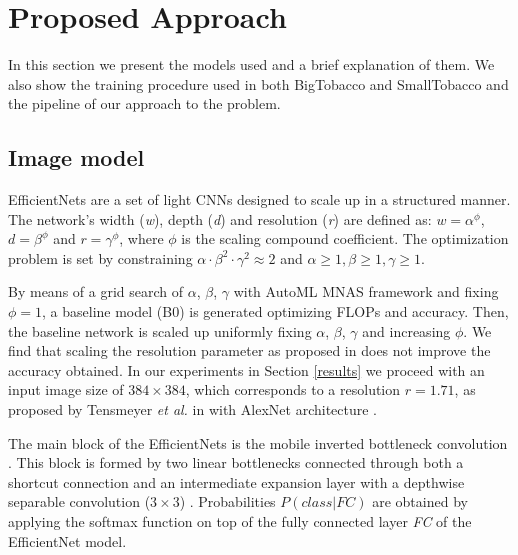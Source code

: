 \documentclass[runningheads]{llncs}
\begin{document}
\section{Proposed Approach}
In this section we present the models used and a brief explanation of them. We also show the training procedure used in both BigTobacco and SmallTobacco and the pipeline of our approach to the problem.



\subsection{Image model}\label{sec:image_model}

EfficientNets \cite{efficientnet} are a set of light CNNs designed to scale up in a structured manner. The network's width (\textit{w}), depth (\textit{d}) and resolution (\textit{r}) are defined as: $w = \alpha^{\phi}$, $d = \beta^{\phi}$ and $r = \gamma^{\phi}$, where $\phi$ is the scaling compound coefficient. The optimization problem is set by constraining $\alpha \cdot \beta^{2} \cdot \gamma^{2} \approx 2$ and $\alpha \geq 1, \beta \geq 1, \gamma \geq 1$.

By means of a grid search of $\alpha$, $\beta$, $\gamma$ with AutoML MNAS framework \cite{mnasnet} and fixing $\phi=1$, a baseline model (B0) is generated optimizing FLOPs and accuracy. Then, the baseline network is scaled up uniformly fixing $\alpha$, $\beta$, $\gamma$ and increasing $\phi$. We find that scaling the resolution parameter as proposed in \cite{efficientnet} does not improve the accuracy obtained. In our experiments in Section \ref{results} we proceed with an input image size of $384\times384$, which corresponds to a resolution $r = 1.71$, as proposed by Tensmeyer \textit{et al.} in \cite{CNNs_analysis} with AlexNet architecture \cite{AlexNet}.

The main block of the EfficientNets is the mobile inverted bottleneck convolution \cite{mobilenetv2,mnasnet}. This block is formed by two linear bottlenecks connected through both a shortcut connection and an intermediate expansion layer with a depthwise separable convolution ($3\times3$) \cite{depthwise}.
Probabilities $P(class|FC)$ are obtained by applying the softmax function on top of the fully connected layer \textit{FC} of the EfficientNet model.

\begin{comment}
\begin{figure}
	\begin{centering}
	\texttt{[image: figures/inverted\_residual\_block.pdf]}
	\caption{Mobile inverted bottleneck block.}
	\label{fig:residual_block}
	\end{centering}
\end{figure}
\end{comment}
\end{document}
